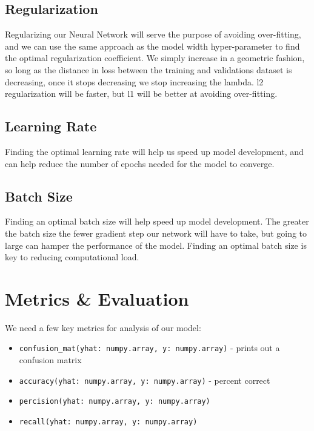 \documentclass{article}
\begin{document}
	\subsection{Regularization}
	
	Regularizing our Neural Network will serve the purpose of avoiding over-fitting, and we can use the same approach as the model width hyper-parameter to 
	find the optimal regularization coefficient. We simply increase in a geometric fashion, so long as the distance in loss between the training and 
	validations dataset is decreasing, once it stops decreasing we stop increasing the lambda. l2 regularization will be faster, but l1 will be better 
	at avoiding over-fitting.  
	
	\subsection{Learning Rate}
	
	Finding the optimal learning rate will help us speed up model development, and can help reduce the number of epochs needed for the model to converge. 
	
	\subsection{Batch Size}
	
	Finding an optimal batch size will help speed up model development. The greater the batch size the fewer gradient step our network will have to take, 
	but going to large can hamper the performance of the model. Finding an optimal batch size is key to reducing computational load. 
	
	\section{Metrics \& Evaluation}
	
	We need a few key metrics for analysis of our model: 
	
	\begin{itemize}
		\item \verb|confusion_mat(yhat: numpy.array, y: numpy.array)| - prints out a confusion matrix 
		\item \verb|accuracy(yhat: numpy.array, y: numpy.array)| - percent correct 
		\item \verb|percision(yhat: numpy.array, y: numpy.array)| 
		\item \verb|recall(yhat: numpy.array, y: numpy.array)| 
	\end{itemize}
	
	

	
\end{document}
